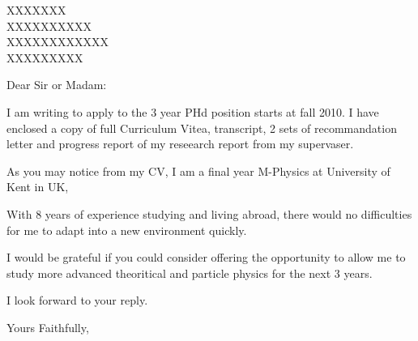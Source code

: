 \documentclass[a4paper]{scrlttr2}
\begin{document}
\begin{letter}{ XXXXXXX \\ XXXXXXXXXX
\\ XXXXXXXXXXXX \\ XXXXXXXXX}


\opening{Dear Sir or Madam:}
 
I am writing to apply to the 3 year PHd position starts at fall 2010. I have enclosed a copy of full Curriculum Vitea, transcript, 2 sets of recommandation letter and progress report of my reseearch report from my supervaser.

As you may notice from my CV, I am a final year M-Physics at University of Kent in UK, 
 

With 8 years of experience studying and living abroad, there would no difficulties for me to adapt into a new environment quickly. 

I would be grateful if you could consider offering the opportunity to allow me to study more advanced theoritical and particle physics for the next 3 years.

I look forward to your reply.
 
\closing{Yours Faithfully,}


\end{letter} 
\end{document}
